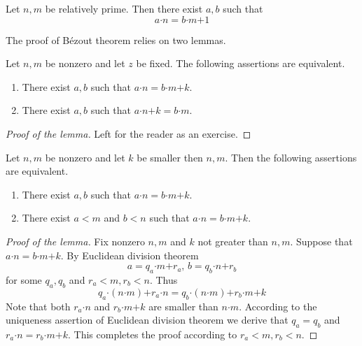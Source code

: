 \documentclass[10pt]{amsart}
\newcommand{\mle}{\boldsymbol{<}}
\newcommand{\meq}{\boldsymbol{=}}
\newcommand{\mplus}{\boldsymbol{+}}
\newcommand{\mdot}{\boldsymbol{\cdot}}
\begin{document}
\begin{theorem}\label{theorem:bezout_theorem}
	Let $n,m$ be relatively prime. Then there exist $a,b$ such that
	$$a\mdot n \meq b\mdot m \mplus 1$$
\end{theorem}
\noindent
The proof of B{\'e}zout theorem relies on two lemmas.

\begin{lemma}\label{lemma:arithmetic_combination_side_does_not_matter}
	Let $n,m$ be nonzero and let $z$ be fixed. The following assertions are equivalent.
	\begin{enumerate}[label=\emph{\textbf{(\roman*)}}, leftmargin=3.0em]
		\item There exist $a,b$ such that $a\mdot n \meq b\mdot m \mplus k$.
		\item There exist $a,b$ such that $a\mdot n \mplus k \meq b\mdot m$.
	\end{enumerate}
\end{lemma}
\begin{proof}[Proof of the lemma]
	Left for the reader as an exercise.
\end{proof}

\begin{lemma}\label{lemma:arithmetic_combination_has_bounded_coefficients}
	Let $n,m$ be nonzero and let $k$ be smaller then $n,m$. Then the following assertions are equivalent.
	\begin{enumerate}[label=\emph{\textbf{(\roman*)}}, leftmargin=3.0em]
		\item There exist $a,b$ such that $a\mdot n \meq b\mdot m \mplus k$.
		\item There exist $a \mle m$ and $b \mle n$ such that $a\mdot n \meq b\mdot m \mplus k$.
	\end{enumerate}
\end{lemma}
\begin{proof}[Proof of the lemma]
	Fix nonzero $n,m$ and $k$ not greater than $n,m$. Suppose that $a\mdot n \meq b\mdot m \mplus k$. By Euclidean division theorem
	$$a \meq q_a\mdot m \mplus r_a,\,b \meq q_b \mdot n \mplus r_b$$
	for some $q_a,q_b$ and $r_a \mle m, r_b \mle n$. Thus
	$$q_a \mdot (n\mdot m) \mplus r_a \mdot n \meq q_b\mdot (n\mdot m) \mplus r_b\mdot m \mplus k$$
	Note that both $r_a \mdot n$ and $r_b \mdot m \mplus k$ are smaller than $n\mdot m$. According to the uniqueness assertion of Euclidean division theorem we derive that $q_a \meq q_b$ and $r_a\mdot n \meq r_b \mdot m \mplus k$. This completes the proof according to $r_a \mle m,r_b \mle n$.
\end{proof}
\end{document}
